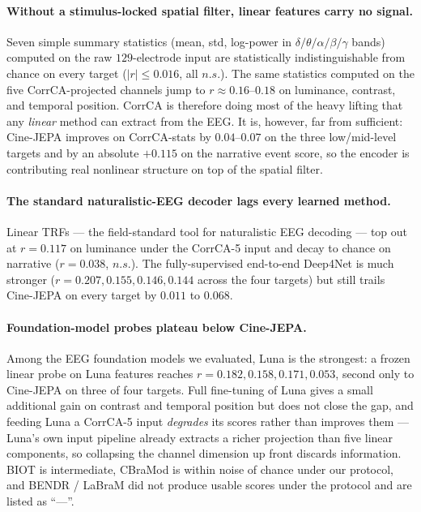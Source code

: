 \paragraph{Without a stimulus-locked spatial filter, linear features carry no signal.}
Seven simple summary statistics (mean, std, log-power in
$\delta\!/\!\theta\!/\!\alpha\!/\!\beta\!/\!\gamma$ bands)
computed on the raw $129$-electrode input are statistically
indistinguishable from chance on every target ($|r| \le 0.016$,
all $n.s.$). The same statistics computed on the five
CorrCA-projected channels jump to $r \approx 0.16$--$0.18$ on
luminance, contrast, and temporal position. CorrCA is therefore
doing most of the heavy lifting that any \emph{linear} method can
extract from the EEG. It is, however, far from sufficient:
Cine-JEPA improves on CorrCA-stats by $0.04$--$0.07$ on the three
low/mid-level targets and by an absolute $+0.115$ on the
narrative event score, so the encoder is contributing real
nonlinear structure on top of the spatial filter.

\paragraph{The standard naturalistic-EEG decoder lags every learned method.}
Linear TRFs — the field-standard tool for naturalistic EEG
decoding \citep{crosse2016mtrf} — top out at $r = 0.117$ on
luminance under the CorrCA-5 input and decay to chance on
narrative ($r = 0.038$, $n.s.$). The fully-supervised end-to-end
Deep4Net is much stronger ($r = 0.207, 0.155, 0.146, 0.144$
across the four targets) but still trails Cine-JEPA on every
target by $0.011$ to $0.068$.

\paragraph{Foundation-model probes plateau below Cine-JEPA.}
Among the EEG foundation models we evaluated, Luna is the
strongest: a frozen linear probe on Luna features reaches
$r = 0.182, 0.158, 0.171, 0.053$, second only to Cine-JEPA on
three of four targets. Full fine-tuning of Luna gives a small
additional gain on contrast and temporal position but does not
close the gap, and feeding Luna a CorrCA-5 input
\emph{degrades} its scores rather than improves them — Luna's
own input pipeline already extracts a richer projection than
five linear components, so collapsing the channel dimension up
front discards information. BIOT is intermediate, CBraMod is
within noise of chance under our protocol, and BENDR / LaBraM
did not produce usable scores under the protocol and are listed
as ``---''.

